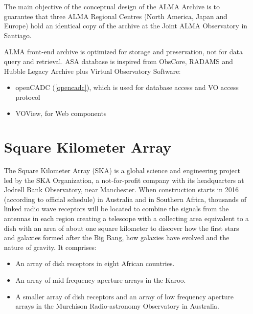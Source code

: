 The main objective of the conceptual design of the ALMA Archive is to guarantee that three ALMA Regional Centres (North America, Japan and Europe) hold an identical copy of the archive at the Joint ALMA Observatory in Santiago. 

ALMA front-end archive is optimized for storage and preservation, not for data query and retrieval. ASA database is inspired from ObsCore, RADAMS and Hubble Legacy Archive plus Virtual Observatory Software:

\begin{itemize}
\item openCADC (\ref{opencadc}), which is used for database access and VO access protocol
\item VOView, for Web components
\end{itemize}



\section{Square Kilometer Array}

The Square Kilometer Array (SKA) is a global science and engineering project led by the SKA Organization, a not-for-profit company with its headquarters at Jodrell Bank Observatory, near Manchester. When construction starts in 2016 (according to official schedule) in Australia and in Southern Africa, thousands of linked radio wave receptors will be located to combine the signals from the antennas in each region creating a telescope with a collecting area equivalent to a dish with an area of about one square kilometer to discover how the first stars and galaxies formed after the Big Bang, how galaxies have evolved and the nature of gravity. It comprises:

\begin{itemize}
\item An array of dish receptors in eight African countries. 
\item An array of mid frequency aperture arrays in the Karoo. 
\item A smaller array of dish receptors and an array of low frequency aperture arrays in the Murchison Radio-astronomy Observatory in Australia.
\end{itemize}

